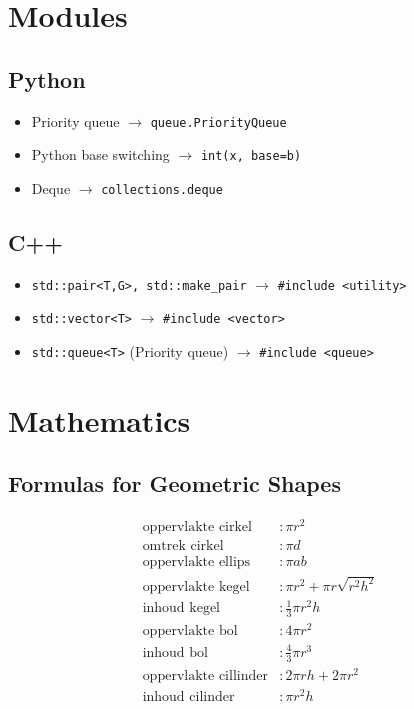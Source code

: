 \documentclass[a4paper, twocolumn]{article}
\newcommand{\arrow}{$\rightarrow$ }
\newcommand{\ms}{\texttt}
\begin{document}
\section{Modules}
\subsection{Python}
\begin{itemize}
	\item Priority queue \arrow \ms{queue.PriorityQueue}
	\item Python base switching \arrow \ms{int(x, base=b)}
	\item Deque \arrow \ms{collections.deque}
\end{itemize}
\subsection{C++}
\begin{itemize}
	\item \ms{std::pair<T,G>, std::make\_pair} \arrow \ms{\#include <utility>}
	\item \ms{std::vector<T>} \arrow \ms{\#include <vector>}
	\item \ms{std::queue<T>} (Priority queue) \arrow \ms{\#include <queue>}
\end{itemize}

\section{Mathematics}
\subsection*{Formulas for Geometric Shapes}
\vspace{-1em}
\begin{align*}
\text{oppervlakte cirkel}   &: \pi r^2 \\
\text{omtrek cirkel}        &: \pi d \\
\text{oppervlakte ellips}   &: \pi a b \\
\text{oppervlakte kegel}    &: \pi r^2 + \pi r \sqrt{r^2 h^2} \\
\text{inhoud kegel}         &: \frac{1}{3}\pi r^2 h \\
\text{oppervlakte bol}      &: 4 \pi r^2 \\
\text{inhoud bol}           &: \frac{4}{3} \pi r^3 \\
\text{oppervlakte cillinder}&: 2\pi rh + 2\pi r^2 \\
\text{inhoud cilinder}      &: \pi r^2 h 
\end{align*}    
\vspace{-2em}
\end{document}
